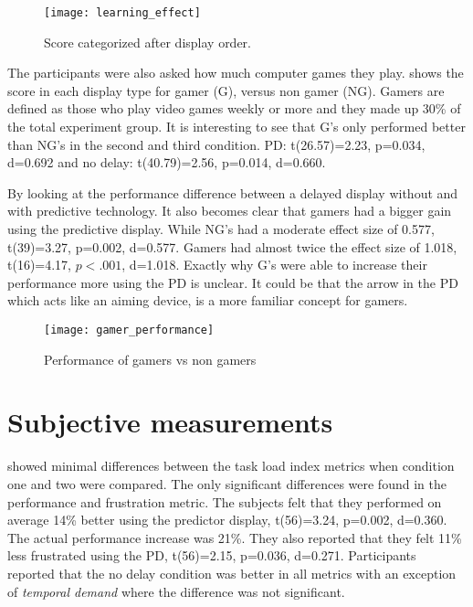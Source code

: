 \begin{figure}[h!]
    \centering
    \texttt{[image: learning\_effect]}
    \caption{Score categorized after display order.}
    \label{learning_effect}
\end{figure}

The participants were also asked how much computer games they play.  shows the score in each display type for gamer (G), versus non gamer (NG). Gamers are defined as those who play video games weekly or more and they made up 30\% of the total experiment group. It is interesting to see that G's only performed better than NG's in the second and third condition. PD: t(26.57)=2.23, p=0.034, d=0.692 and no delay: t(40.79)=2.56, p=0.014, d=0.660.

By looking at the performance difference between a delayed display without and with predictive technology. It also becomes clear that gamers had a bigger gain using the predictive display. While NG's had a moderate effect size of 0.577, t(39)=3.27, p=0.002, d=0.577. Gamers had almost twice the effect size of 1.018, t(16)=4.17, $p<.001$, d=1.018. Exactly why G's were able to increase their performance more using the PD is unclear. It could be that the arrow in the PD which acts like an aiming device, is a more familiar concept for gamers.


\begin{figure}[h!]
    \centering
    \texttt{[image: gamer\_performance]}
    \caption{Performance of gamers vs non gamers}
    \label{gamer_performance}
\end{figure}


\section{Subjective measurements}

 showed minimal differences between the task load index metrics when condition one and two were compared. The only significant differences were found in the performance and frustration metric. The subjects felt that they performed on average 14\% better using the predictor display, t(56)=3.24, p=0.002, d=0.360. The actual performance increase was 21\%. They also reported that they felt 11\% less frustrated using the PD, t(56)=2.15, p=0.036, d=0.271. Participants reported that the no delay condition was better in all metrics with an exception of \emph{temporal demand} where the difference was not significant.

